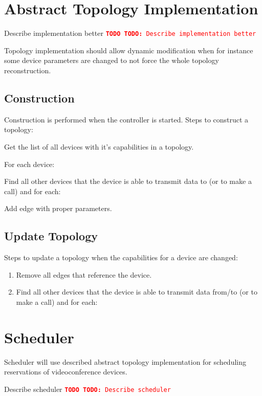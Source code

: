 \documentclass[a4paper]{report}
\newcommand{\TODO}[1]{%
\def\empty{}%
\def\prvniparametr{#1}%
\ifx\prvniparametr\empty%
\begingroup\tt\textcolor{red}{\noindent\textbf{TODO}}\endgroup
\else%
\begingroup\tt\textcolor{red}{\noindent\textbf{TODO:}\ #1}\endgroup
\fi%
}
\begin{document}
\chapter{Abstract Topology Implementation}

\TODO{Describe implementation better}

Topology implementation should allow dynamic modification when for instance some device parameters are changed to not force the whole topology reconstruction.      
      
\section{Construction}

Construction is performed when the controller is started. Steps to construct a topology:

\begin{enumerate}

\item Get the list of all devices with it's capabilities in a topology.

\item For each device: 
  \begin{compactitem}
  \item Find all other devices that the device is able to transmit
  data to (or to make a call) and for each:
    \begin{compactitem}
    \item Add edge with proper parameters.
    \end{compactitem}
  \end{compactitem}

\end{enumerate}     
     
\section{Update Topology}     

Steps to update a topology when the capabilities for a device are changed:
\begin{enumerate}

\item Remove all edges that reference the device.

\item Find all other devices that the device is able to transmit data from/to
   (or to make a call) and for each:

\end{enumerate}  


\chapter{Scheduler}

Scheduler will use described abstract topology implementation for scheduling reservations of videoconference devices.

\TODO{Describe scheduler}
\end{document}

